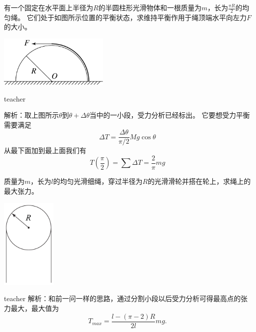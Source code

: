 \begin{example}
有一个固定在水平面上半径为$R$的半圆柱形光滑物体和一根质量为$m$，长为$ \frac{\pi R}{2}$的均匀绳。
它们处于如图所示位置的平衡状态，求维持平衡作用于绳顶端水平向左力$F$的大小。
\begin{flushright}
\includegraphics[width=0.4\textwidth]{images/static-force-31.pdf}
\end{flushright}
\begin{taggedblock}{teacher}

\vspace*{3cm}
\noindent
解析：取上图所示$\theta$到$\theta+\Delta \theta$当中的一小段，受力分析已经标出。
它要想受力平衡需要满足
\[
\Delta T = \frac{\Delta \theta}{\pi/2}Mg\cos\theta 
\]
从最下面加到最上面我们有
\[
T(\frac{\pi}{2}) = \sum\Delta T = \frac{2}{\pi}mg
\]
\end{taggedblock}
\end{example}

\begin{example}
质量为$m$，长为$l$的均匀光滑细绳，穿过半径为$R$的光滑滑轮并搭在轮上，求绳上的最大张力。
\begin{flushright}
\includegraphics[width = 0.2\textwidth]{images/static-force-20.pdf} 
\end{flushright}
\begin{taggedblock}{teacher}
\noindent
解析：和前一问一样的思路，通过分割小段以后受力分析可得最高点的张力最大，最大值为
\[
T_{max} = \frac{l-(\pi-2)R}{2l}mg.
\]
\end{taggedblock}
\end{example}

